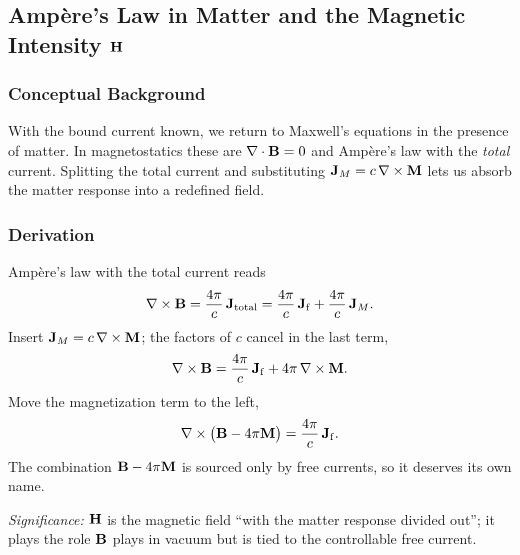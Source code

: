 
\subsection{Amp\`ere's Law in Matter and the Magnetic Intensity $\mathbf{H}$}\label{subsec:lec17-H-field}

\subsubsection*{Conceptual Background}
With the bound current known, we return to Maxwell's equations in the presence of
matter.  In magnetostatics these are $\nabla\cdot\mathbf{B}=0$ and Amp\`ere's law with the
\emph{total} current.  Splitting the total current and substituting
$\mathbf{J}_M=c\,\nabla\times\mathbf{M}$ lets us absorb the matter response into a redefined
field.

\subsubsection*{Derivation}
Amp\`ere's law with the total current reads
\begin{equation}\label{eq:lec17-ampere-total}
  \nabla\times\mathbf{B}=\frac{4\pi}{c}\,\mathbf{J}_{\rm total}
  =\frac{4\pi}{c}\,\mathbf{J}_{\rm f}+\frac{4\pi}{c}\,\mathbf{J}_M.
\end{equation}
Insert $\mathbf{J}_M=c\,\nabla\times\mathbf{M}$; the factors of $c$ cancel in the last term,
\begin{equation}\label{eq:lec17-ampere-sub}
  \nabla\times\mathbf{B}=\frac{4\pi}{c}\,\mathbf{J}_{\rm f}+4\pi\,\nabla\times\mathbf{M}.
\end{equation}
Move the magnetization term to the left,
\begin{equation}\label{eq:lec17-ampere-rearranged}
  \nabla\times\bigl(\mathbf{B}-4\pi\mathbf{M}\bigr)=\frac{4\pi}{c}\,\mathbf{J}_{\rm f}.
\end{equation}
The combination $\mathbf{B}-4\pi\mathbf{M}$ is sourced only by free currents, so it deserves its
own name.

\textit{Significance:} $\mathbf{H}$ is the magnetic field ``with the matter response divided
out''; it plays the role $\mathbf{B}$ plays in vacuum but is tied to the controllable free
current.


